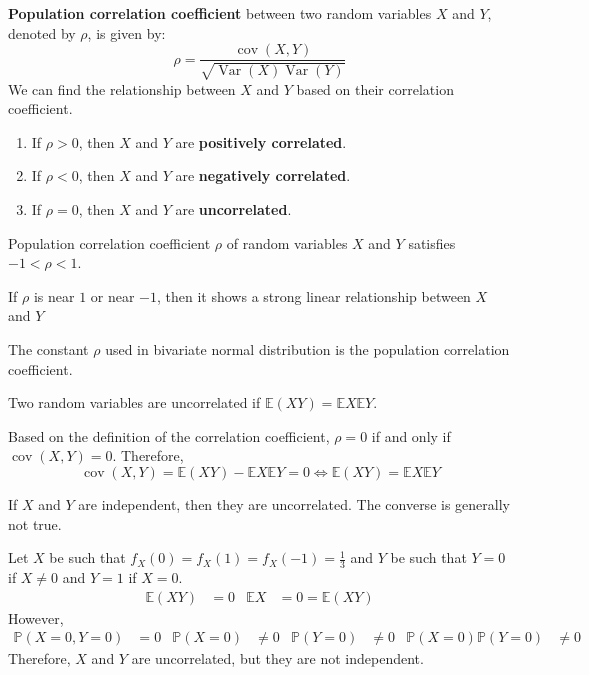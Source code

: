 \documentclass{huhtakm-template-book}
\newcommand{\prob}{\mathbb{P}}
\newcommand{\expect}{\mathbb{E}}
\DeclareMathOperator{\Var}{Var}
\DeclareMathOperator{\cov}{cov}
\begin{document}
\begin{defn}
	\textbf{Population correlation coefficient} between two random variables $X$ and $Y$, denoted by $\rho$, is given by:
	\begin{equation*}
		\rho=\frac{\cov(X,Y)}{\sqrt{\Var(X)\Var(Y)}}
	\end{equation*}
	We can find the relationship between $X$ and $Y$ based on their correlation coefficient.
	\begin{enumerate}
		\item If $\rho>0$, then $X$ and $Y$ are \textbf{positively correlated}.
		\item If $\rho<0$, then $X$ and $Y$ are \textbf{negatively correlated}.
		\item If $\rho=0$, then $X$ and $Y$ are \textbf{uncorrelated}.
	\end{enumerate}
\end{defn}
\begin{rem}
	Population correlation coefficient $\rho$ of random variables $X$ and $Y$ satisfies $-1<\rho<1$.
\end{rem}
\begin{rem}
	If $\rho$ is near $1$ or near $-1$, then it shows a strong linear relationship between $X$ and $Y$
\end{rem}
\begin{rem}
	The constant $\rho$ used in bivariate normal distribution is the population correlation coefficient.
\end{rem}
\begin{lem}
	Two random variables are uncorrelated if $\expect(XY)=\expect{X}\expect{Y}$.
\end{lem}
\begin{proofing}
	Based on the definition of the correlation coefficient, $\rho=0$ if and only if $\cov(X,Y)=0$. Therefore,
	\begin{equation*}
		\cov(X,Y)=\expect(XY)-\expect{X}\expect{Y}=0\iff \expect(XY)=\expect{X}\expect{Y}
	\end{equation*}
\end{proofing}
\begin{rem}
	If $X$ and $Y$ are independent, then they are uncorrelated. The converse is generally not true.
\end{rem}
\begin{eg}
	Let $X$ be such that $f_{X}(0)=f_{X}(1)=f_{X}(-1)=\frac{1}{3}$ and $Y$ be such that $Y=0$ if $X\neq0$ and $Y=1$ if $X=0$.
	\begin{align*}
		\expect(XY)&=0 &  \expect X&=0=\expect(XY)
	\end{align*}
	However,
	\begin{align*}
		\prob(X=0,Y=0)&=0 & \prob(X=0)&\neq 0 & \prob(Y=0)&\neq 0 & \prob(X=0)\prob(Y=0)&\neq 0
	\end{align*}
	Therefore, $X$ and $Y$ are uncorrelated, but they are not independent.
\end{eg}
\end{document}

